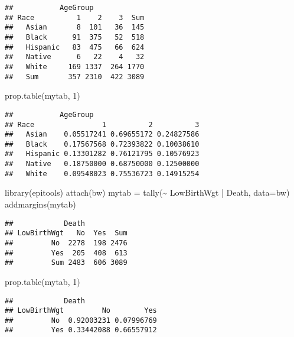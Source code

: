 \documentclass[
]{article}
\newenvironment{Shaded}{\begin{snugshade}}{\end{snugshade}}
\newcommand{\AttributeTok}[1]{\textcolor[rgb]{0.77,0.63,0.00}{#1}}
\newcommand{\DecValTok}[1]{\textcolor[rgb]{0.00,0.00,0.81}{#1}}
\newcommand{\FunctionTok}[1]{\textcolor[rgb]{0.00,0.00,0.00}{#1}}
\newcommand{\NormalTok}[1]{#1}
\newcommand{\OtherTok}[1]{\textcolor[rgb]{0.56,0.35,0.01}{#1}}
\newcommand{\SpecialCharTok}[1]{\textcolor[rgb]{0.00,0.00,0.00}{#1}}
\begin{document}
\begin{verbatim}
##           AgeGroup
## Race          1    2    3  Sum
##   Asian       8  101   36  145
##   Black      91  375   52  518
##   Hispanic   83  475   66  624
##   Native      6   22    4   32
##   White     169 1337  264 1770
##   Sum       357 2310  422 3089
\end{verbatim}

\begin{Shaded}
\begin{Highlighting}[]
\FunctionTok{prop.table}\NormalTok{(mytab, }\DecValTok{1}\NormalTok{)}
\end{Highlighting}
\end{Shaded}

\begin{verbatim}
##           AgeGroup
## Race                1          2          3
##   Asian    0.05517241 0.69655172 0.24827586
##   Black    0.17567568 0.72393822 0.10038610
##   Hispanic 0.13301282 0.76121795 0.10576923
##   Native   0.18750000 0.68750000 0.12500000
##   White    0.09548023 0.75536723 0.14915254
\end{verbatim}

\begin{Shaded}
\begin{Highlighting}[]
\FunctionTok{library}\NormalTok{(epitools)}
\FunctionTok{attach}\NormalTok{(bw)}
\NormalTok{mytab }\OtherTok{=} \FunctionTok{tally}\NormalTok{(}\SpecialCharTok{\textasciitilde{}}\NormalTok{ LowBirthWgt }\SpecialCharTok{|}\NormalTok{ Death, }\AttributeTok{data=}\NormalTok{bw)}
\FunctionTok{addmargins}\NormalTok{(mytab)}
\end{Highlighting}
\end{Shaded}

\begin{verbatim}
##            Death
## LowBirthWgt   No  Yes  Sum
##         No  2278  198 2476
##         Yes  205  408  613
##         Sum 2483  606 3089
\end{verbatim}

\begin{Shaded}
\begin{Highlighting}[]
\FunctionTok{prop.table}\NormalTok{(mytab, }\DecValTok{1}\NormalTok{)}
\end{Highlighting}
\end{Shaded}

\begin{verbatim}
##            Death
## LowBirthWgt         No        Yes
##         No  0.92003231 0.07996769
##         Yes 0.33442088 0.66557912
\end{verbatim}
\end{document}
